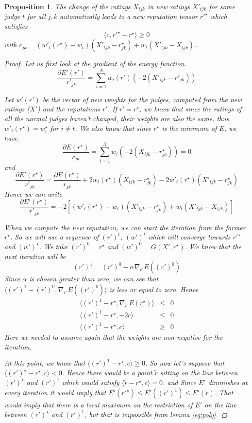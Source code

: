 \documentclass[12pt,a4paper]{article}
\newtheorem{proposition}{Proposition}
\begin{document}
\begin{proposition}
The change of the ratings $X_{tjk}$ in new ratings $X'_{tjk}$ for some judge $t$ for all $j,k$ automatically leads to a new reputation tensor $r'^{\star}$ which satisfies 
$$ \langle c, r'^{\star} - r^{\star} \rangle \geq 0$$
with $c_{jk} = ( w'_t(r^{\star})- w_t) (X'_{tjk}-r^{\star}_{jk}) + w_t(X'_{tjk}-X_{tjk}) $.
\label{pr:hyperp}
\begin{proof}
Let us first look at the gradient of the energy function.
$$\frac{\partial E'(r')}{r'_{jk}} = \sum_{i=1}^N w_i(r') (-2 (X'_{ijk}-r'_{jk}))$$

Let $w'(r')$ be the vector of new weights for the judges, computed from the new ratings ($X'$) and the reputations $r'$.
If $r' = r^{\star}$, we know that since the ratings of all the normal judges haven't changed, their weights are also the same, thus $w'_i(r^{\star}) = w_i^{\star}$ for $i \neq t$. We also know that since $r^{\star}$ is the minimum of $E$, we have 
$$ \frac{\partial E(r^{\star})}{r_{jk}} = \sum_{i=1}^N w_i (-2 (X_{ijk}-r^{\star}_{jk})) = 0$$
and 
$$ \frac{\partial E'(r^{\star})}{r'_{jk}} = \frac{\partial E(r^{\star})}{r_{jk}}+2w_t(r^{\star})(X_{tjk}-r^{\star}_{jk})-2 w'_t(r^{\star}) (X'_{tjk}-r^{\star}_{jk}) $$
Hence we can write
$$ \frac{\partial E'(r^{\star})}{r'_{jk}} = -2 \left[ ( w'_t(r^{\star})- w_t) (X'_{tjk}-r^{\star}_{jk}) + w_t(X'_{tjk}-X_{tjk}) \right]$$

When we compute the new reputation, we can start the iteration from the former $r^{\star}$. So we will use a sequence of $(r')^t$, $(w')^t$ which will converge towards $r'^{\star}$ and $(w')^{\star}$.
We take $(r')^0 = r^{\star}$ and $(w')^0 = G(X',r^{\star})$. We know that the next iteration will be 
$$ (r')^1 = (r')^0 - \alpha \nabla_{r'}E((r')^0)$$
Since $\alpha$ is chosen greater than zero, we can see that $\langle (r')^1 - (r')^0, \nabla_{r'}E((r')^0) \rangle$ is less or equal to zero.
Hence 
\begin{eqnarray*}
\langle (r')^1 - r^{\star}, \nabla_{r'}E(r^{\star})\rangle & \leq & 0\\
\langle (r')^1 - r^{\star}, -2 c\rangle & \leq & 0\\
\langle (r')^1 - r^{\star}, c\rangle & \geq & 0
\end{eqnarray*}
Here we needed to assume again that the weights are non-negative for the iteration.

At this point, we know that $\langle (r')^1 - r^{\star}, c\rangle  \geq  0$.
So now let's suppose that $\langle(r')^{\star} - r^{\star}, c\rangle  <  0$. Hence there would be a point $\tilde{r}$ sitting on the line between $(r')^{\star}$ and $(r')^1$ which would satisfy $\langle \tilde{r}- r^{\star}, c\rangle = 0 $. and Since $E'$ diminishes at every iteration it would imply that $E'(r'^{\star}) \leq E'((r')^1) \leq E'(\tilde{r}) $. That would imply that there is a local maximum on the restriction of $E'$ on the line between $(r')^{\star}$ and $(r')^1$, but that is impossible from lemma \ref{eq:poly}.
\end{proof}

\end{proposition}
\end{document}
